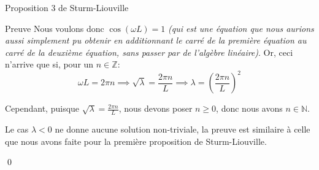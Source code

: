 \documentclass[a4paper]{article}
\begin{document}
\begin{parag}{Proposition 3 de Sturm-Liouville}
\begin{subparag}{Preuve}
        Nous voulons donc $\cos\left(\omega L\right) = 1$ \textit{(qui est une équation que nous aurions aussi simplement pu obtenir en additionnant le carré de la première équation au carré de la deuxième équation, sans passer par de l'algèbre linéaire)}. Or, ceci n'arrive que si, pour un $n \in \mathbb{Z}$: 
        \[\omega L = 2\pi n \implies \sqrt{\lambda} = \frac{2 \pi n}{L} \implies \lambda = \left(\frac{2\pi n}{L}\right)^2\]

        Cependant, puisque $\sqrt{\lambda} = \frac{2\pi n}{L}$, nous devons poser $n \geq 0$, donc nous avons $n \in \mathbb{N}$.

        Le cas $\lambda < 0$ ne donne aucune solution non-triviale, la preuve est similaire à celle que nous avons faite pour la première proposition de Sturm-Liouville.

        \qed
    \end{subparag}
\end{parag}
\end{document}
